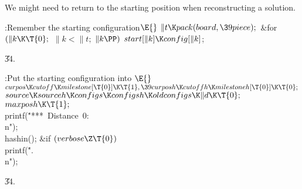 We might need to return to the starting position when
reconstructing
a solution.

\Y\B\4:Remember the starting configuration\X${}\E{}$\6
$\|t\K\\{pack}(\\{board},\39\\{piece});{}$\6
\&{for} ${}(\|k\K\T{0};{}$ ${}\|k<\|t;{}$ ${}\|k\PP){}$\1\5
${}\\{start}[\|k]\K\\{config}[\|k]{}$;\2\par
\U34.\fi

\B{}:Put the starting configuration into %
\X${}\E{}$\6
$\\{curpos}\K\\{cutoff}\K\\{milestone}[\T{0}]\K\T{1},\39\\{curposh}\K%
\\{cutoffh}\K\\{milestoneh}[\T{0}]\K\T{0};{}$\6
${}\\{source}\K\\{sourceh}\K\\{configs}\K\\{configsh}\K\\{oldconfigs}\K\|d\K%
\T{0};{}$\6
${}\\{maxposh}\K\T{1};{}$\6
\\{printf}(\.{"***\ Distance\ 0:\\n"});\6
\\{hashin}();\6
\&{if} ${}(\\{verbose}\Z\T{0}){}$\1\5
\\{printf}(\.{".\\n"});\2\par
\U34.\fi

